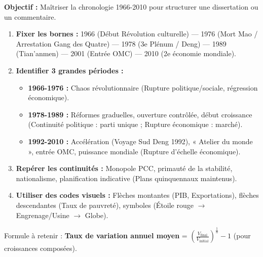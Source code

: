 \documentclass[11pt]{article}
\newcommand{\cle}[1]{{\popxbold\color{popdark}#1}}
\begin{document}
\begin{methode}
\textbf{Objectif :} Maîtriser la chronologie 1966-2010 pour structurer une dissertation ou un commentaire.
\begin{enumerate}
    \item \textbf{Fixer les bornes :} 1966 (Début Révolution culturelle) — 1976 (Mort Mao / Arrestation Gang des Quatre) — 1978 (3e Plénum / Deng) — 1989 (Tian'anmen) — 2001 (Entrée OMC) — 2010 (2e économie mondiale).
    \item \textbf{Identifier 3 grandes périodes :} 
    \begin{itemize}
        \item \textbf{1966-1976 :} Chaos révolutionnaire (Rupture politique/sociale, régression économique).
        \item \textbf{1978-1989 :} Réformes graduelles, ouverture contrôlée, début croissance (Continuité politique : parti unique ; Rupture économique : marché).
        \item \textbf{1992-2010 :} Accélération (Voyage Sud Deng 1992), « Atelier du monde », entrée OMC, puissance mondiale (Rupture d'échelle économique).
    \end{itemize}
    \item \textbf{Repérer les continuités :} Monopole PCC, primauté de la stabilité, nationalisme, planification indicative (Plans quinquennaux maintenus).
    \item \textbf{Utiliser des codes visuels :} Flèches montantes (PIB, Exportations), flèches descendantes (Taux de pauvreté), symboles (Étoile rouge $\rightarrow$ Engrenage/Usine $\rightarrow$ Globe).
\end{enumerate}
\cle{Formule à retenir :} \textbf{Taux de variation annuel moyen} = $\left( \frac{V_{\text{final}}}{V_{\text{initial}}} \right)^{\frac{1}{n}} - 1$ (pour croissances composées).
\end{methode}
\end{document}
